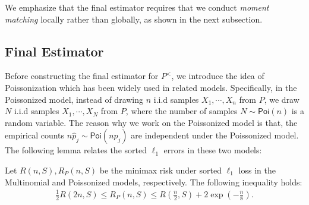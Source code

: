 \documentclass[final,12pt]{colt2018} %
\def \spo {\mathsf{Poi}}
\begin{document}
We emphasize that the final estimator requires that we conduct \emph{moment matching} locally rather than globally, as shown in the next subsection. 

\subsection{Final Estimator}
Before constructing the final estimator for $P^<$, we introduce the idea of Poissonization which has been widely used in related models. Specifically, in the Poissonized model, instead of drawing $n$ i.i.d samples $X_1,\cdots,X_n$ from $P$, we draw $N$ i.i.d samples $X_1,\cdots,X_N$ from $P$, where the number of samples $N\sim \spo(n)$ is a random variable. The reason why we work on the Poissonized model is that, the empirical counts $n\hat{p}_j\sim \spo(np_j)$ are independent under the Poissonized model. The following lemma relates the sorted $\ell_1$ errors in these two models:
\begin{lemma}\label{lemma.poissonization}
	Let $R(n,S), R_P(n,S)$ be the minimax risk under sorted $\ell_1$ loss in the Multinomial and Poissonized models, respectively. The following inequality holds:
	\begin{align*}
	\frac{1}{2}R(2n,S) \le R_P(n,S) \le R(\frac{n}{2},S) + 2\exp(-\frac{n}{8}).
	\end{align*}
\end{lemma}
\end{document}
